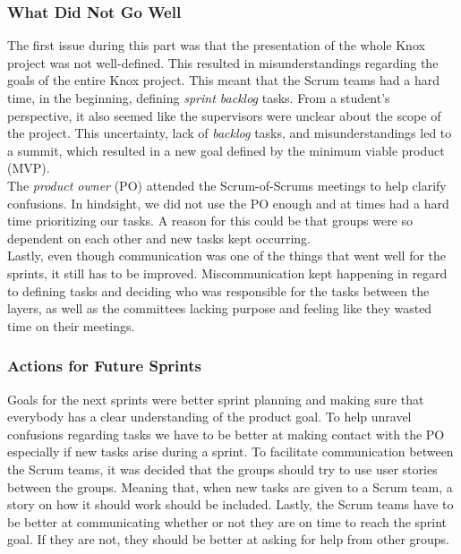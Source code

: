 \subsubsection{What Did Not Go Well}
The first issue during this part was that the presentation of the whole Knox project was not well-defined. This resulted in misunderstandings regarding the goals of the entire Knox project. This meant that the Scrum teams had a hard time, in the beginning, defining \textit{sprint backlog} tasks. From a student's perspective, it also seemed like the supervisors were unclear about the scope of the project. This uncertainty, lack of \textit{backlog} tasks, and misunderstandings led to a summit, which resulted in a new goal defined by the minimum viable product (MVP).\\

\noindent The \textit{product owner} (PO) attended the Scrum-of-Scrums meetings to help clarify confusions. In hindsight, we did not use the PO enough and at times had a hard time prioritizing our tasks. A reason for this could be that groups were so dependent on each other and new tasks kept occurring. \\

\noindent Lastly, even though communication was one of the things that went well for the sprints, it still has to be improved. Miscommunication kept happening in regard to defining tasks and deciding who was responsible for the tasks between the layers, as well as the committees lacking purpose and feeling like they wasted time on their meetings.

\subsubsection{Actions for Future Sprints}
Goals for the next sprints were better sprint planning and making sure that everybody has a clear understanding of the product goal. 
To help unravel confusions regarding tasks we have to be better at making contact with the PO especially if new tasks arise during a sprint. 
To facilitate communication between the Scrum teams, it was decided that the groups should try to use user stories between the groups. Meaning that, when new tasks are given to a Scrum team, a story on how it should work should be included.
Lastly, the Scrum teams have to be better at communicating whether or not they are on time to reach the sprint goal. If they are not, they should be better at asking for help from other groups. 